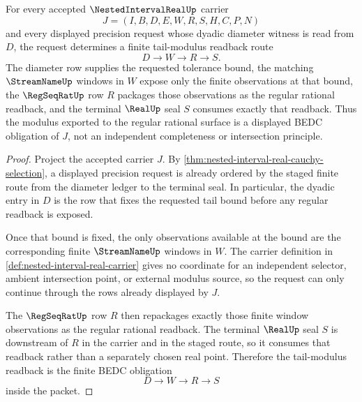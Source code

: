 \begin{theorem}
\label{thm:nested-interval-real-tail-modulus-readback}
For every accepted $\NestedIntervalRealUp$ carrier
$$
J=(I,B,D,E,W,R,S,H,C,P,N)
$$
and every displayed precision request whose dyadic diameter witness is read from $D$, the request determines a finite tail-modulus readback route
$$
D \longrightarrow W \longrightarrow R \longrightarrow S .
$$
The diameter row supplies the requested tolerance bound, the matching $\StreamNameUp$ windows in $W$ expose only the finite observations at that bound, the $\RegSeqRatUp$ row $R$ packages those observations as the regular rational readback, and the terminal $\RealUp$ seal $S$ consumes exactly that readback. Thus the modulus exported to the regular rational surface is a displayed BEDC obligation of $J$, not an independent completeness or intersection principle.
\end{theorem}
\begin{proof}
Project the accepted carrier $J$. By \autoref{thm:nested-interval-real-cauchy-selection}, a displayed precision request is already ordered by the staged finite route from the diameter ledger to the terminal seal. In particular, the dyadic entry in $D$ is the row that fixes the requested tail bound before any regular readback is exposed.

Once that bound is fixed, the only observations available at the bound are the corresponding finite $\StreamNameUp$ windows in $W$. The carrier definition in \autoref{def:nested-interval-real-carrier} gives no coordinate for an independent selector, ambient intersection point, or external modulus source, so the request can only continue through the rows already displayed by $J$.

The $\RegSeqRatUp$ row $R$ then repackages exactly those finite window observations as the regular rational readback. The terminal $\RealUp$ seal $S$ is downstream of $R$ in the carrier and in the staged route, so it consumes that readback rather than a separately chosen real point. Therefore the tail-modulus readback is the finite BEDC obligation
$$
D \longrightarrow W \longrightarrow R \longrightarrow S
$$
inside the packet.
\end{proof}

